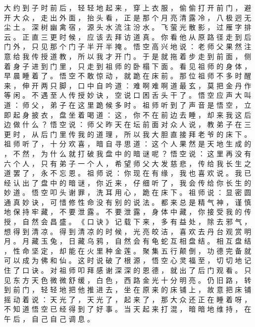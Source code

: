 {大 约 到 子 时 前 后 ， 轻 轻 地 起 来 ， 穿 上 衣 服 ， 偷 偷 打 开 前 门 ， 避 开 大 众 ， 走 出 外 面 ， 抬 头 看 ， 正 是 那 个 月 亮 清 露 冷 ， 八 极 迥 无 尘 土 。
深 树 幽 禽 宿 ， 源 头 水 流 注 汾 水 。
飞 萤 光 散 影 ， 过 雁 字 排 云 。
正 直 三 更 时 候 ， 应 该 去 拜 访 道 真 。
你 看 他 从 原 路 径 走 到 后 门 外 ， 只 见 那 个 门 子 半 开 半 掩 。
悟 空 高 兴 地 说 ： 老 师 父 果 然 注 意 给 我 传 授 道 教 ， 所 以 我 才 开 门 。
于 是 就 拖 着 步 走 到 前 面 ， 侧 着 身 子 进 到 门 里 ， 只 走 到 祖 师 的 卧 榻 下 面 。
看 见 祖 师 的 身 体 ， 早 晨 睡 着 了 。
悟 空 不 敢 惊 动 ， 就 跪 在 床 前 。
那 位 祖 师 不 多 时 醒 来 ， 伸 开 两 只 脚 ， 口 中 自 吟 道 ： 难 啊 难 啊 道 最 玄 ， 莫 把 金 丹 作 等 闲 。
不 遇 至 人 传 授 妙 诀 ， 空 说 口 困 舌 头 干 了 。 悟 空 应 声 大 叫 道 ： 师 父 ， 弟 子 在 这 里 跪 候 多 时 。
祖 师 听 到 了 声 音 是 悟 空 ， 立 即 起 身 披 衣 ， 盘 坐 着 喝 道 ： 这 ， 你 不 在 前 边 去 睡 ， 却 来 我 这 后 边 做 什 么 ？ 悟 空 说 ： 师 父 昨 天 在 坛 前 面 对 众 人 说 ， 教 弟 子 在 三 更 时 ， 从 后 门 里 传 我 的 道 理 ， 所 以 我 大 胆 直 接 拜 老 爷 的 床 下 。
祖 师 听 了 ， 十 分 欢 喜 ， 暗 自 寻 思 道 ： 这 个 人 果 然 是 天 地 生 成 的 ， 不 然 ， 为 什 么 就 打 破 我 盘 中 的 暗 谜 呢 ？ 悟 空 说 ： 这 里 再 没 有 六 个 人 ， 只 有 弟 子 一 个 人 ， 希 望 师 父 大 发 慈 悲 ， 传 给 我 长 生 之 道 罢 了 ， 永 不 忘 恩 。
祖 师 说 ： 你 现 在 有 缘 ， 我 也 喜 欢 说 。
我 已 经 认 出 了 盘 中 的 暗 谜 ， 你 近 来 ， 仔 细 听 了 ， 我 会 传 给 你 长 生 的 妙 道 。
悟 空 叩 头 谢 罪 ， 洗 耳 用 心 ， 跪 在 床 下 。
祖 师 说 ： 显 密 圆 通 真 妙 诀 ， 可 惜 修 性 命 没 有 别 的 说 法 。
都 来 总 是 精 气 神 ， 谨 慎 地 保 持 牢 藏 ， 不 要 泄 露 。
不 要 泄 露 ， 身 体 中 藏 ， 你 接 受 我 的 传 授 ， 自 然 会 昌 盛 。
《 口 诀 》 记 载 下 来 ， 多 有 益 处 ， 除 去 邪 气 ， 想 得 到 清 凉 。
得 到 清 凉 的 时 候 ， 光 亮 皎 洁 ， 喜 欢 去 丹 台 观 赏 明 月 。
月 藏 玉 兔 ， 日 藏 乌 鸦 ， 自 然 会 有 龟 蛇 互 相 盘 结 。
相 互 盘 结 ， 性 命 坚 定 ， 却 能 在 火 里 种 金 莲 。
聚 集 五 行 颠 倒 ， 功 德 完 备 就 可 以 成 为 佛 和 仙 。
这 时 说 破 了 根 源 ， 悟 空 心 灵 福 至 ， 切 切 地 记 住 了 口 诀 。
对 祖 师 叩 拜 感 谢 深 深 的 恩 德 ， 就 出 了 后 门 观 看 。
只 见 东 方 天 色 微 微 舒 缓 ， 白 色 ， 西 路 金 光 十 分 明 亮 。
仍 旧 路 ， 转 到 前 门 ， 轻 轻 地 把 他 推 进 去 ， 坐 在 原 来 的 床 铺 上 ， 故 意 把 床 铺 摇 动 着 说 ： 天 光 了 ， 天 光 了 ， 起 来 了 ， 那 大 众 还 正 在 睡 着 呀 ， 不 知 道 悟 空 已 经 得 到 了 好 事 。
当 天 起 来 打 混 ， 暗 暗 地 维 持 ， 在 午 后 ， 自 己 自 己 调 息 。
}
